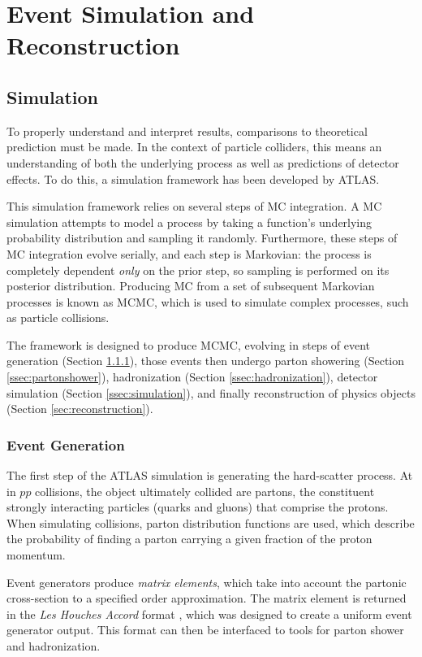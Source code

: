 \chapter{Event Simulation and Reconstruction}

\section{Simulation} \label{sec:simulation}

To properly understand and interpret results, comparisons to theoretical prediction must be made. In the context of particle colliders, this means an understanding of both the underlying process as well as predictions of detector effects. To do this, a simulation framework has been developed by ATLAS. 

This simulation framework relies on several steps of \gls{MC} integration. A \gls{MC} simulation attempts to model a process by taking a function's underlying probability distribution and sampling it randomly. Furthermore, these steps of \gls{MC} integration evolve serially, and each step is Markovian: the process is completely dependent \textit{only} on the prior step, so sampling is performed on its posterior distribution. Producing \gls{MC} from a set of subsequent Markovian processes is known as \gls{MCMC}, which is used to simulate complex processes, such as particle collisions.

The framework is designed to produce \gls{MCMC}, evolving in steps of event generation (Section \ref{ssec:eventgen}), those events then undergo parton showering (Section \ref{ssec:partonshower}), hadronization (Section \ref{ssec:hadronization}), detector simulation (Section \ref{ssec:simulation}), and finally reconstruction of physics objects (Section \ref{sec:reconstruction}).

\subsection{Event Generation} \label{ssec:eventgen}
The first step of the ATLAS simulation is generating the hard-scatter process. At in $pp$ collisions, the object ultimately collided are partons, the constituent strongly interacting particles (quarks and gluons) that comprise the protons. When simulating collisions, parton distribution functions are used, which describe the probability of finding a parton carrying a given fraction of the proton momentum.


Event generators produce \textit{matrix elements}, which take into account the partonic cross-section to a specified order approximation. The matrix element is returned in the \textit{Les Houches Accord} format \cite{les-houches}, which was designed to create a uniform event generator output. This format can then be interfaced to tools for parton shower and hadronization.

